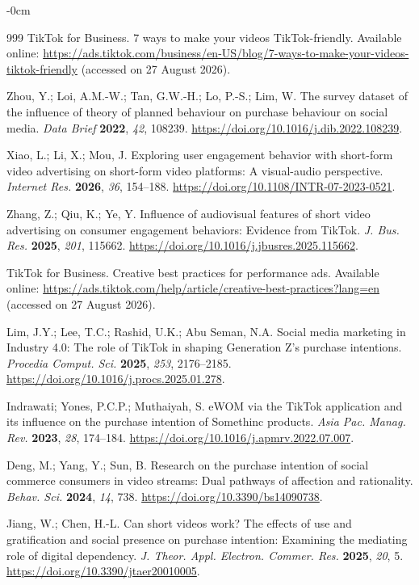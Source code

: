 \documentclass[jtaer,article,submit,moreauthors]{Definitions/mdpi}
\begin{document}
\begin{adjustwidth}{-\extralength}{0cm}
\begin{thebibliography}{999}
	TikTok for Business.
	7 ways to make your videos TikTok-friendly.
	Available online:
	\url{https://ads.tiktok.com/business/en-US/blog/7-ways-to-make-your-videos-tiktok-friendly}
	(accessed on 27 August 2026).
	
	Zhou, Y.; Loi, A.M.-W.; Tan, G.W.-H.; Lo, P.-S.; Lim, W.
	The survey dataset of the influence of theory of planned behaviour on
	purchase behaviour on social media.
	{\em Data Brief} {\bf 2022}, {\em 42}, 108239.
	\url{https://doi.org/10.1016/j.dib.2022.108239}.
	
	Xiao, L.; Li, X.; Mou, J.
	Exploring user engagement behavior with short-form video advertising
	on short-form video platforms: A visual-audio perspective.
	{\em Internet Res.} {\bf 2026}, {\em 36}, 154--188.
	\url{https://doi.org/10.1108/INTR-07-2023-0521}.
	
	Zhang, Z.; Qiu, K.; Ye, Y.
	Influence of audiovisual features of short video advertising on
	consumer engagement behaviors: Evidence from TikTok.
	{\em J. Bus. Res.} {\bf 2025}, {\em 201}, 115662.
	\url{https://doi.org/10.1016/j.jbusres.2025.115662}.
	
	TikTok for Business.
	Creative best practices for performance ads.
	Available online:
	\url{https://ads.tiktok.com/help/article/creative-best-practices?lang=en}
	(accessed on 27 August 2026).
	
	Lim, J.Y.; Lee, T.C.; Rashid, U.K.; Abu Seman, N.A.
	Social media marketing in Industry 4.0: The role of TikTok in shaping
	Generation Z's purchase intentions.
	{\em Procedia Comput. Sci.} {\bf 2025}, {\em 253}, 2176--2185.
	\url{https://doi.org/10.1016/j.procs.2025.01.278}.
	
	Indrawati; Yones, P.C.P.; Muthaiyah, S.
	eWOM via the TikTok application and its influence on the purchase
	intention of Somethinc products.
	{\em Asia Pac. Manag. Rev.} {\bf 2023}, {\em 28}, 174--184.
	\url{https://doi.org/10.1016/j.apmrv.2022.07.007}.
	
	Deng, M.; Yang, Y.; Sun, B.
	Research on the purchase intention of social commerce consumers in
	video streams: Dual pathways of affection and rationality.
	{\em Behav. Sci.} {\bf 2024}, {\em 14}, 738.
	\url{https://doi.org/10.3390/bs14090738}.
	
	Jiang, W.; Chen, H.-L.
	Can short videos work? The effects of use and gratification and social
	presence on purchase intention: Examining the mediating role of digital
	dependency.
	{\em J. Theor. Appl. Electron. Commer. Res.} {\bf 2025}, {\em 20}, 5.
	\url{https://doi.org/10.3390/jtaer20010005}.
	

\end{thebibliography}
\end{adjustwidth}
\end{document}
